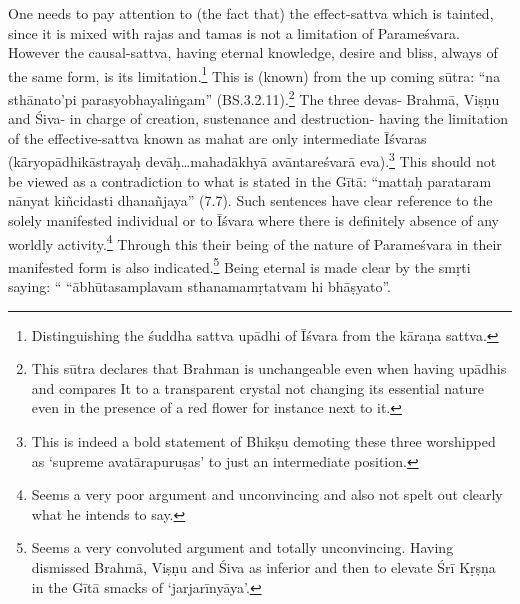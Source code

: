 One needs to pay attention to (the fact that) the effect-sattva which is tainted, since it is mixed with rajas and tamas is not a limitation of Parameśvara. However the causal-sattva, having eternal knowledge, desire and bliss, always of the same form, is its limitation.\footnote{Distinguishing the śuddha sattva upādhi of Īśvara from the kāraṇa sattva.} This is (known) from the up coming sūtra: “na sthānato’pi parasyobhayaliṅgam” (BS.3.2.11).\footnote{This sūtra declares that Brahman is unchangeable even when having upādhis and compares It to a transparent crystal not changing its essential nature even in the presence of a red flower for instance next to it.} The three devas- Brahmā, Viṣṇu and Śiva- in charge of creation, sustenance and destruction- having the limitation of the effective-sattva known as mahat are only intermediate Īśvaras (kāryopādhikāstrayaḥ devāḥ…mahadākhyā avāntareśvarā eva).\footnote{This is indeed a bold statement of Bhikṣu demoting these three worshipped as ‘supreme avatārapuruṣas’ to just an intermediate position.} This should not be viewed as a contradiction to what is stated in the Gītā: “mattaḥ parataram nānyat kiñcidasti dhanañjaya” (7.7). Such sentences have clear reference to the solely manifested individual or to Īśvara where there is definitely absence of any worldly activity.\footnote{Seems a very poor argument and unconvincing and also not spelt out clearly what he intends to say.} Through this their being of the nature of Parameśvara in their manifested form is also indicated.\footnote{Seems a very convoluted argument and totally unconvincing. Having dismissed Brahmā, Viṣṇu and Śiva as inferior and then to elevate Śrī Kṛṣṇa in the Gītā smacks of ‘jarjarīnyāya’.} Being eternal is made clear by the smṛti saying: “ “ābhūtasamplavam sthanamamṛtatvam hi bhāṣyato”.  

